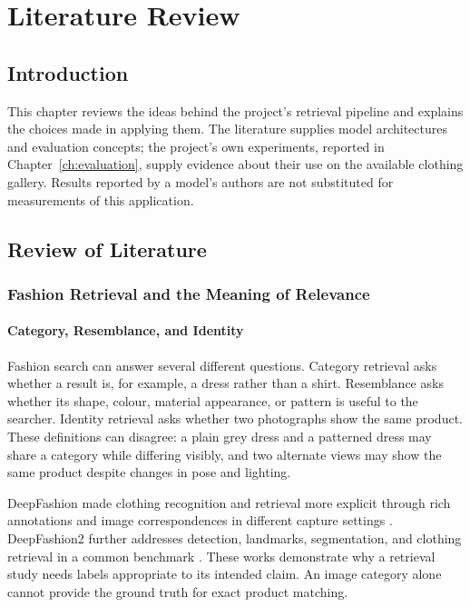 \chapter{Literature Review}
\label{ch:literature}

\section{Introduction}
This chapter reviews the ideas behind the project's retrieval pipeline and
explains the choices made in applying them. The literature supplies model
architectures and evaluation concepts; the project's own experiments, reported
in Chapter~\ref{ch:evaluation}, supply evidence about their use on the available
clothing gallery. Results reported by a model's authors are not substituted for
measurements of this application.

\section{Review of Literature}
\subsection{Fashion Retrieval and the Meaning of Relevance}
\subsubsection{Category, Resemblance, and Identity}
Fashion search can answer several different questions. Category retrieval asks
whether a result is, for example, a dress rather than a shirt. Resemblance asks
whether its shape, colour, material appearance, or pattern is useful to the
searcher. Identity retrieval asks whether two photographs show the same product.
These definitions can disagree: a plain grey dress and a patterned dress may
share a category while differing visibly, and two alternate views may show the
same product despite changes in pose and lighting.

DeepFashion made clothing recognition and retrieval more explicit through rich
annotations and image correspondences in different capture settings
\cite{Liu2016DeepFashion}. DeepFashion2 further addresses detection, landmarks,
segmentation, and clothing retrieval in a common benchmark
\cite{Ge2019DeepFashion2}. These works demonstrate why a retrieval study needs
labels appropriate to its intended claim. An image category alone cannot provide
the ground truth for exact product matching.

